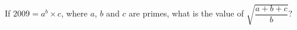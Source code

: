If $2009=a^b\times c$, where $a$, $b$ and $c$ are primes, what is the value of $\sqrt{\dfrac{a+b+c}{b}}$?
